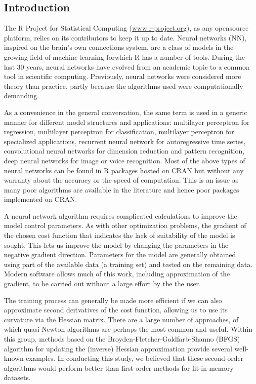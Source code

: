 \hypertarget{introduction}{%
\subsection{Introduction}\label{introduction}}

The R Project for Statistical Computing (\url{www.r-project.org}), as
any opensource platform, relies on its contributors to keep it up to
date. Neural networks (NN), inspired on the brain's own connections
system, are a class of models in the growing field of machine learning
forwhich R has a number of tools. During the last 30 years, neural
networks have evolved from an academic topic to a common tool in
scientific computing. Previously, neural networks were considered more
theory than practice, partly because the algorithms used were
computationally demanding.

As a convenience in the general conversation, the same term is used in a
generic manner for different model structures and applications:
multilayer perceptron for regression, multilayer perceptron for
classification, multilayer perceptron for specialized applications,
recurrent neural network for autoregressive time series, convolutional
neural networks for dimension reduction and pattern recognition, deep
neural networks for image or voice recognition. Most of the above types
of neural networks can be found in R packages hosted on CRAN but without
any warranty about the accuracy or the speed of computation. This is an
issue as many poor algorithms are available in the literature and hence
poor packages implemented on CRAN.

A neural network algorithm requires complicated calculations to improve
the model control parameters. As with other optimization problems, the
gradient of the chosen cost function that indicates the lack of
suitability of the model is sought. This lets us improve the model by
changing the parameters in the negative gradient direction. Parameters
for the model are generally obtained using part of the available data (a
training set) and tested on the remaining data. Modern software allows
much of this work, including approximation of the gradient, to be
carried out without a large effort by the the user.

The training process can generally be made more efficient if we can also
approximate second derivatives of the cost function, allowing us to use
its curvature via the Hessian matrix. There are a large number of
approaches, of which quasi-Newton algorithms are perhaps the most common
and useful. Within this group, methods based on the
Broyden-Fletcher-Goldfarb-Shanno (BFGS) algorithm for updating the
(inverse) Hessian approximation provide several well-known examples. In
conducting this study, we believed that these second-order algorithms
would perform better than first-order methods for fit-in-memory
datasets.

